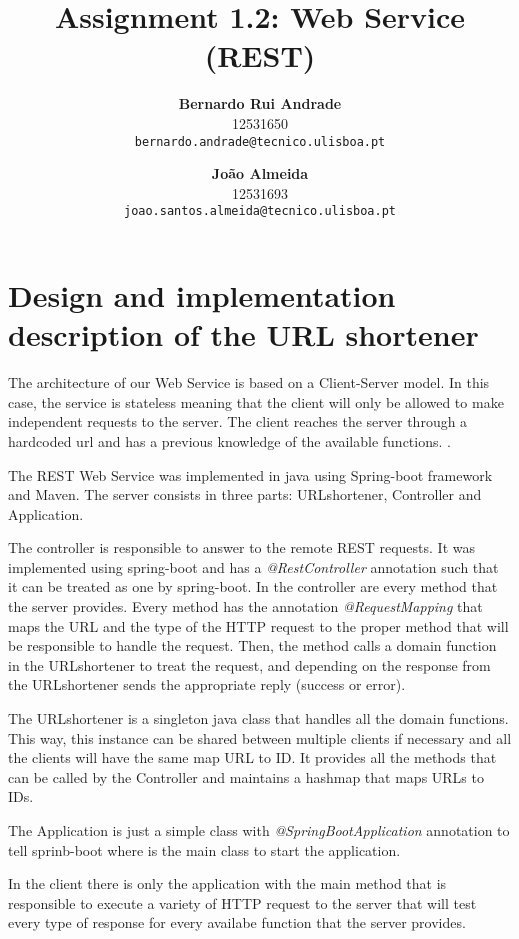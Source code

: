 \documentclass[a4paper]{article}
\begin{document}
\title{Assignment 1.2: Web Service (REST)}
\author{
  \textbf{Bernardo Rui Andrade}\\
  12531650 \\
  \texttt{bernardo.andrade@tecnico.ulisboa.pt} \\
  \and
  \textbf{João Almeida}\\
 12531693\\
  \texttt{joao.santos.almeida@tecnico.ulisboa.pt} \\
}
\maketitle
\section*{Design and implementation description of the URL shortener}
The architecture of our Web Service is based on a Client-Server model. In this case, the service is stateless meaning that the client will only be allowed to make independent requests to the server. The client reaches the server through a hardcoded url and has a previous knowledge of the available functions.  .\par
The REST Web Service was implemented in java using Spring-boot framework and Maven. The server consists in three parts: URLshortener, Controller and Application.\par
The controller is responsible to answer to the remote REST requests.  It was implemented using spring-boot and has a \textit{@RestController} annotation such that it can be treated as one by spring-boot. In the controller are every method that the server provides. Every method has the annotation \textit{@RequestMapping} that maps the URL and the type of the HTTP request to the proper method that will be responsible to handle the request. Then, the method calls a domain function in the URLshortener to treat the request, and depending on the response from the URLshortener sends the appropriate reply (success or error). \par
The URLshortener is a singleton java class that handles all the domain functions. This way, this instance can be shared between multiple clients if necessary and all the clients will have the same map URL to ID. It provides all the methods that can be called by the Controller and maintains a hashmap that maps URLs to IDs.\par
The Application is just a simple class with \textit{@SpringBootApplication} annotation to tell sprinb-boot where is the main class to start the application. \par
In the client there is only the application with the main method that is responsible to execute a variety of HTTP request to the server that will test every type of response for every availabe function that the server provides. 
\end{document}
